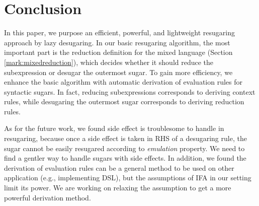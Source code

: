 \section{Conclusion}
\label{sec7}


In this paper, we purpose an efficient, powerful, and lightweight resugaring approach by lazy desugaring.
In our basic resugaring algorithm, the most important part is the reduction definition for the  mixed language (Section \ref{mark:mixedreduction}), which decides whether it should reduce the subexpression or desugar the outermost sugar.
To gain more efficiency, we enhance the basic algorithm with automatic derivation of  evaluation rules for syntactic sugars.
In fact, reducing subexpressions corresponds to  deriving context rules, while desugaring the outermost sugar corresponds to deriving reduction rules.


As for the future work, we found side effect is troublesome to handle in resugaring, because once a side effect is taken in RHS of a desugaring rule, the sugar cannot be easily resugared according to \emph{emulation} property. We need to find a gentler way to handle sugars with side effects. In addition, we found the derivation of evaluation rules can be a general method to be used on other application (e.g., implementing DSL), but the assumptions of IFA in our setting limit its power. We are working on relaxing the assumption to get a more powerful derivation method.
